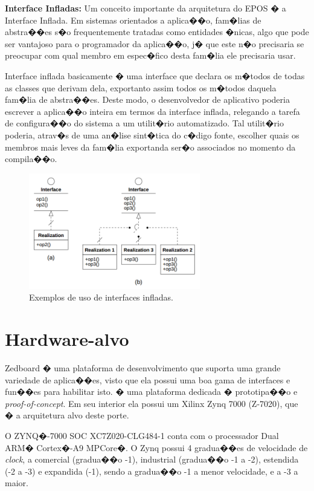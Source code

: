\documentclass{ufscThesis/ufscThesis} %
\begin{document}
\textbf{Interface Infladas: } Um conceito importante da arquitetura do EPOS � a Interface Inflada. %
Em sistemas orientados a aplica��o, fam�lias de abstra��es s�o frequentemente tratadas como entidades �nicas, algo que pode ser vantajoso para o programador da aplica��o, j� que este n�o precisaria se preocupar com qual membro em espec�fico desta fam�lia ele precisaria usar\cite{guto_thesis}.

Interface inflada basicamente � uma interface que declara os m�todos de todas as classes que derivam dela, exportanto assim todos os m�todos daquela fam�lia de abstra��es. Deste modo, o desenvolvedor de aplicativo poderia escrever a aplica��o inteira em termos da interface inflada, relegando a tarefa de configura��o do sistema a um utilit�rio automatizado. Tal utilit�rio poderia, atrav�s de uma an�lise sint�tica do c�digo fonte, escolher quais os membros mais leves da fam�lia exportanda ser�o associados no momento da compila��o\cite[p.~56]{guto_thesis}.

\begin{figure}[ht!]
    \centering
    \includegraphics[width=7.5cm]{figuras/inflated_interface}
    \caption{Exemplos de uso de interfaces infladas\cite{guto_thesis}.}
\end{figure}


\section{Hardware-alvo}
Zedboard � uma plataforma de desenvolvimento que suporta uma grande variedade de aplica��es, visto que ela possui uma boa gama de interfaces e fun��es para habilitar isto. � uma plataforma dedicada � prototipa��o e \emph{proof-of-concept}. Em seu interior ela possui um Xilinx Zynq 7000 (Z-7020), que � a arquitetura alvo deste porte.

O ZYNQ�-7000 SOC XC7Z020-CLG484-1 conta com o processador Dual ARM� Cortex�-A9 MPCore�. O Zynq possui 4 gradua��es de velocidade de \emph{clock}, a comercial (gradua��o -1), industrial (gradua��o -1 a -2), estendida (-2 a -3) e expandida (-1), sendo a gradua��o -1 a menor velocidade, e a -3 a maior\cite{product_table}.
\end{document}
